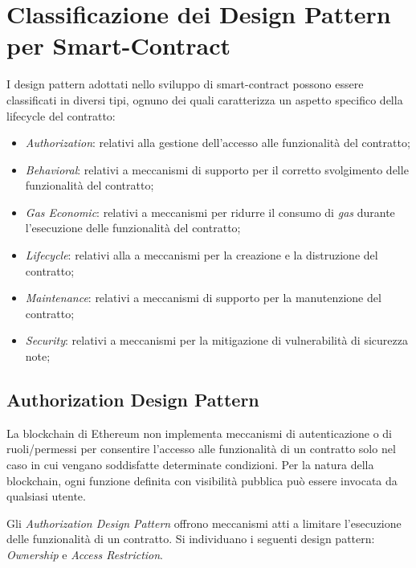 \chapter{Classificazione dei Design Pattern per Smart-Contract}\label{classificazione_intro}

\vspace{4cm}
I design pattern adottati nello sviluppo di smart-contract possono essere classificati in diversi tipi\cite[alcuni tipi]{9089272}\cite{9050163}, ognuno dei quali caratterizza un aspetto specifico della lifecycle del contratto:

\begin{itemize}
	\item \textit{Authorization}: relativi alla gestione dell'accesso alle funzionalità del contratto;
	\item \textit{Behavioral}: relativi a meccanismi di supporto per il corretto svolgimento delle funzionalità del contratto;
	\item \textit{Gas Economic}: relativi a meccanismi per ridurre il consumo di \textit{gas} durante l'esecuzione delle funzionalità del contratto;
	\item \textit{Lifecycle}: relativi alla a meccanismi per la creazione e la distruzione del contratto;
	\item \textit{Maintenance}: relativi a meccanismi di supporto per la manutenzione del contratto;
	\item \textit{Security}: relativi a meccanismi per la mitigazione di vulnerabilità di sicurezza note;
\end{itemize}

\section{Authorization Design Pattern}
La blockchain di Ethereum non implementa meccanismi di autenticazione o di ruoli/permessi per consentire l'accesso alle funzionalità di un contratto solo nel caso in cui vengano soddisfatte determinate condizioni. Per la natura della blockchain, ogni funzione definita con visibilità pubblica può essere invocata da qualsiasi utente.\par
Gli \textit{Authorization Design Pattern} offrono meccanismi atti a limitare l'esecuzione delle funzionalità di un contratto. Si individuano i seguenti design pattern: \textit{Ownership} e \textit{Access Restriction}.
